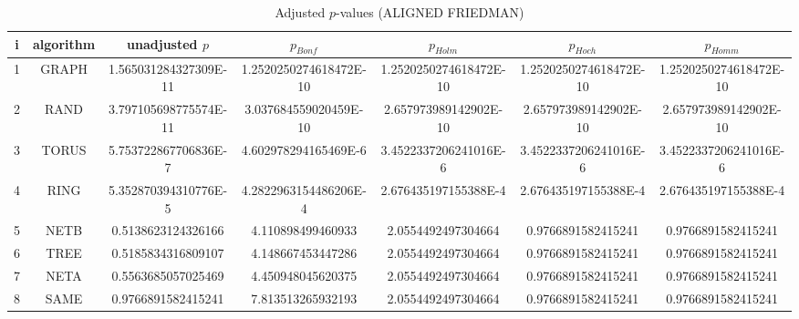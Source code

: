 \documentclass[a4paper,10pt]{article}
\begin{document}
\begin{landscape}
\begin{table}[!htp]
\centering\scriptsize
\caption{Adjusted $p$-values (ALIGNED FRIEDMAN)}
\begin{tabular}{ccccccc}
i&algorithm&unadjusted $p$&$p_{Bonf}$&$p_{Holm}$&$p_{Hoch}$&$p_{Homm}$\\
\hline
1& GRAPH&1.565031284327309E-11&1.2520250274618472E-10&1.2520250274618472E-10&1.2520250274618472E-10&1.2520250274618472E-10\\
2& RAND&3.797105698775574E-11&3.037684559020459E-10&2.657973989142902E-10&2.657973989142902E-10&2.657973989142902E-10\\
3& TORUS&5.753722867706836E-7&4.602978294165469E-6&3.4522337206241016E-6&3.4522337206241016E-6&3.4522337206241016E-6\\
4& RING&5.352870394310776E-5&4.2822963154486206E-4&2.676435197155388E-4&2.676435197155388E-4&2.676435197155388E-4\\
5& NETB&0.5138623124326166&4.110898499460933&2.0554492497304664&0.9766891582415241&0.9766891582415241\\
6& TREE&0.5185834316809107&4.148667453447286&2.0554492497304664&0.9766891582415241&0.9766891582415241\\
7& NETA&0.5563685057025469&4.450948045620375&2.0554492497304664&0.9766891582415241&0.9766891582415241\\
8& SAME&0.9766891582415241&7.813513265932193&2.0554492497304664&0.9766891582415241&0.9766891582415241\\
\hline
\end{tabular}
\end{table}


\end{landscape}
\end{document}
